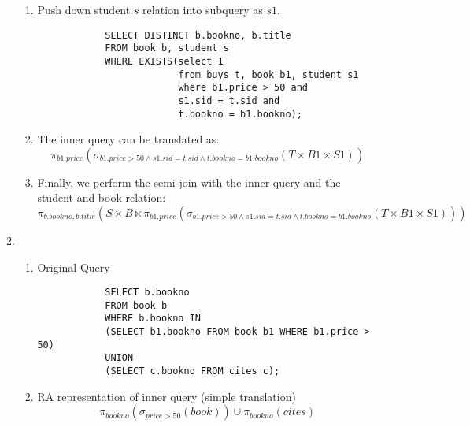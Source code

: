 \documentclass{article}
\begin{document}
\begin{enumerate}
\begin{enumerate}
\begin{enumerate}
            \item Push down student $s$ relation into subquery as $s1$.
            \begin{lstlisting}
            SELECT DISTINCT b.bookno, b.title
            FROM book b, student s
            WHERE EXISTS(select 1
                         from buys t, book b1, student s1
                         where b1.price > 50 and
                         s1.sid = t.sid and
                         t.bookno = b1.bookno);
            \end{lstlisting}

            \item The inner query can be translated as:
            \begin{displaymath}
                \pi_{b1.price}(
                    \sigma_{b1.price>50 \wedge s1.sid=t.sid \wedge t.bookno=b1.bookno}(T \times B1 \times S1
                    ))
            \end{displaymath}

            \item Finally, we perform the semi-join with the inner query and the student and book relation:
            \begin{displaymath}
                \pi_{b.bookno, b.title}(S \times B \ltimes
                \pi_{b1.price}(
                    \sigma_{b1.price>50 \wedge s1.sid=t.sid \wedge t.bookno=b1.bookno}(T \times B1 \times S1
                    )))
            \end{displaymath}

        \end{enumerate}

        \item %

        \begin{enumerate}
            \item Original Query
            \begin{lstlisting}
            SELECT b.bookno
            FROM book b
            WHERE b.bookno IN
            (SELECT b1.bookno FROM book b1 WHERE b1.price > 50)
            UNION
            (SELECT c.bookno FROM cites c);
            \end{lstlisting}

            \item RA representation of inner query (simple translation)
            \begin{displaymath}
                \pi_{bookno}(\sigma_{price > 50}(book)) \cup \pi_{bookno}(cites)
            \end{displaymath}


\end{enumerate}
\end{enumerate}
\end{enumerate}
\end{document}
